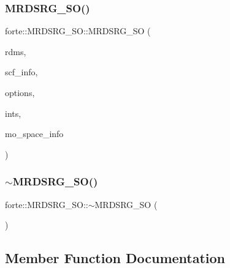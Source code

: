 \subsubsection{\texorpdfstring{M\+R\+D\+S\+R\+G\+\_\+\+S\+O()}{MRDSRG\_SO()}}
{\footnotesize\ttfamily forte\+::\+M\+R\+D\+S\+R\+G\+\_\+\+S\+O\+::\+M\+R\+D\+S\+R\+G\+\_\+\+SO (\begin{DoxyParamCaption}\item[{\mbox{\hyperlink{classforte_1_1_r_d_ms}{R\+D\+Ms}}}]{rdms,  }\item[{std\+::shared\+\_\+ptr$<$ \mbox{\hyperlink{classforte_1_1_s_c_f_info}{S\+C\+F\+Info}} $>$}]{scf\+\_\+info,  }\item[{std\+::shared\+\_\+ptr$<$ \mbox{\hyperlink{classforte_1_1_forte_options}{Forte\+Options}} $>$}]{options,  }\item[{std\+::shared\+\_\+ptr$<$ \mbox{\hyperlink{classforte_1_1_forte_integrals}{Forte\+Integrals}} $>$}]{ints,  }\item[{std\+::shared\+\_\+ptr$<$ \mbox{\hyperlink{classforte_1_1_m_o_space_info}{M\+O\+Space\+Info}} $>$}]{mo\+\_\+space\+\_\+info }\end{DoxyParamCaption})}

\mbox{\label{classforte_1_1_m_r_d_s_r_g___s_o_ac8e43f3e7d3af3259b8ba62ea5f442d3}} 
\subsubsection{\texorpdfstring{$\sim$\+M\+R\+D\+S\+R\+G\+\_\+\+S\+O()}{~MRDSRG\_SO()}}
{\footnotesize\ttfamily forte\+::\+M\+R\+D\+S\+R\+G\+\_\+\+S\+O\+::$\sim$\+M\+R\+D\+S\+R\+G\+\_\+\+SO (\begin{DoxyParamCaption}{ }\end{DoxyParamCaption})}



\subsection{Member Function Documentation}
\mbox{\label{classforte_1_1_m_r_d_s_r_g___s_o_a63219770ebebd21647950812bf20b88e}} 
